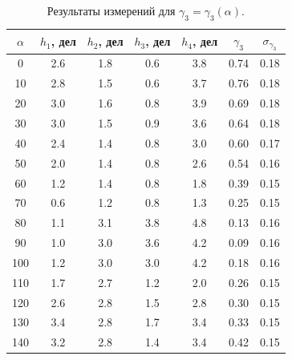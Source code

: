 \documentclass[a4paper,12pt]{article}
\begin{document}
\begin{table}[h]
\begin{tabular}{|c|c|c|c|c|c|c|}
\hline
$\alpha$ & $h_1$, дел & $h_2$, дел & $h_3$, дел & $h_4$, дел & $\gamma_3$ & $\sigma_{\gamma_3}$ \\ \hline
0        & 2.6        & 1.8        & 0.6        & 3.8        & 0.74       & 0.18      \\ \hline
10       & 2.8        & 1.5        & 0.6        & 3.7        & 0.76       & 0.18      \\ \hline
20       & 3.0        & 1.6        & 0.8        & 3.9        & 0.69       & 0.18      \\ \hline
30       & 3.0        & 1.5        & 0.9        & 3.6        & 0.64       & 0.18      \\ \hline
40       & 2.4        & 1.4        & 0.8        & 3.0        & 0.60       & 0.17      \\ \hline
50       & 2.0        & 1.4        & 0.8        & 2.6        & 0.54       & 0.16      \\ \hline
60       & 1.2        & 1.4        & 0.8        & 1.8        & 0.39       & 0.15      \\ \hline
70       & 0.6        & 1.2        & 0.8        & 1.3        & 0.25       & 0.15      \\ \hline
80       & 1.1        & 3.1        & 3.8        & 4.8        & 0.13       & 0.16      \\ \hline
90       & 1.0        & 3.0        & 3.6        & 4.2        & 0.09       & 0.16      \\ \hline
100      & 1.2       & 3.0        & 3.0          & 4.2        & 0.18       & 0.16      \\ \hline
110      & 1.7        & 2.7        & 1.2        & 2.0        & 0.26       & 0.15      \\ \hline
120      & 2.6        & 2.8        & 1.5        & 2.8        & 0.30       & 0.15      \\ \hline
130      & 3.4        & 2.8        & 1.7        & 3.4        & 0.33       & 0.15      \\ \hline
140      & 3.2        & 2.8        & 1.4        & 3.4        & 0.42       & 0.15      \\ \hline
\end{tabular}
\centering
\caption{Результаты измерений для $\gamma_3 = \gamma_3(\alpha)$.}
\end{table} 
\end{document}
